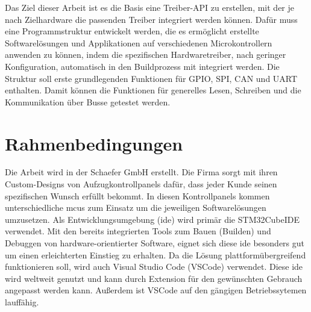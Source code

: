 Das Ziel dieser Arbeit ist es die Basis eine Treiber-API zu erstellen, mit der je nach Zielhardware die passenden Treiber integriert werden können.
Dafür muss eine Programmstruktur entwickelt werden, die es ermöglicht erstellte Softwarelösungen und Applikationen auf verschiedenen Microkontrollern anwenden zu können, indem die spezifischen Hardwaretreiber, nach geringer Konfiguration, automatisch in den Buildprozess mit integriert werden.
Die Struktur soll erste grundlegenden Funktionen für GPIO, SPI, CAN und UART enthalten. 
Damit können die Funktionen für generelles Lesen, Schreiben und die Kommunikation über Busse getestet werden.
\\
%
%
%




\section{Rahmenbedingungen}
Die Arbeit wird in der Schaefer GmbH erstellt. 
Die Firma sorgt mit ihren Custom-Designs von Aufzugkontrollpanels dafür, dass jeder Kunde seinen spezifischen Wunsch erfüllt bekommt.
In diesen Kontrollpanels kommen unterschiedliche \gls{mcu}s zum Einsatz um die jeweiligen Softwarelösungen umzusetzen.
Als Entwicklungsumgebung (\gls{ide}) wird primär die STM32CubeIDE verwendet.
Mit den bereits integrierten Tools zum Bauen (Builden) und Debuggen von hardware-orientierter Software, eignet sich diese \gls{ide} besonders gut um einen erleichterten Einstieg zu erhalten.
Da die Lösung plattformübergreifend funktionieren soll, wird auch Visual Studio Code (VSCode) verwendet.
Diese \gls{ide} wird weltweit genutzt und kann durch Extension für den gewünschten Gebrauch angepasst werden kann. 
Außerdem ist VSCode auf den gängigen Betriebssytemen lauffähig.

